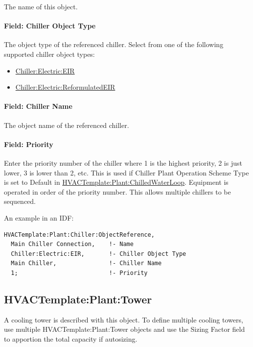 The name of this object.

\paragraph{Field: Chiller Object Type}

The object type of the referenced chiller. Select from one of the following supported chiller object types:

\begin{itemize}
\item
  \hyperref[chillerelectriceir]{Chiller:Electric:EIR}
\item
  \hyperref[chillerelectricreformulatedeir]{Chiller:Electric:ReformulatedEIR}
\end{itemize}

\paragraph{Field: Chiller Name}\label{field-chiller-name}

The object name of the referenced chiller.

\paragraph{Field: Priority}\label{field-priority-1}

Enter the priority number of the chiller where 1 is the highest priority, 2 is just lower, 3 is lower than 2, etc. This is used if Chiller Plant Operation Scheme Type is set to Default in \hyperref[hvactemplateplantchilledwaterloop]{HVACTemplate:Plant:ChilledWaterLoop}. Equipment is operated in order of the priority number. This allows multiple chillers to be sequenced.

An example in an IDF:

\begin{lstlisting}
HVACTemplate:Plant:Chiller:ObjectReference,
  Main Chiller Connection,    !- Name
  Chiller:Electric:EIR,       !- Chiller Object Type
  Main Chiller,               !- Chiller Name
  1;                          !- Priority
\end{lstlisting}

\subsection{HVACTemplate:Plant:Tower}\label{hvactemplateplanttower}

A cooling tower is described with this object. To define multiple cooling towers, use multiple HVACTemplate:Plant:Tower objects and use the Sizing Factor field to apportion the total capacity if autosizing.

